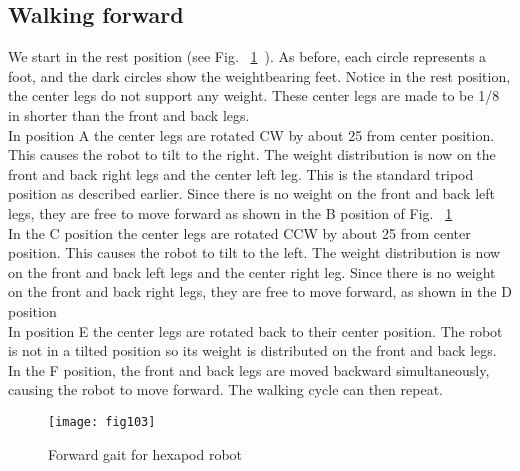 \documentclass{report}
\begin{document}
\subsection{Walking forward}
We start in the rest position (see Fig. ~\ref{35}\ ). As before, each circle represents a foot, and the dark circles
show the weightbearing feet. Notice in the rest position, the center legs do not support any weight. These
center legs are made to be 1/8 in shorter than the front and back legs.\\
In position A the center legs are rotated CW by about 25 from center position. This causes the robot to tilt to the right. The weight distribution is now on the front and back right legs and the center left leg.
This is the standard tripod position as described earlier. Since there is no weight on the front and back left
legs, they are free to move forward as shown in the B position of Fig. ~\ref{35}\ \\
In the C position the center legs are rotated CCW by about 25 from center position. This causes the
robot to tilt to the left. The weight distribution is now on the front and back left legs and the center right
leg. Since there is no weight on the front and back right legs, they are free to move forward, as shown in the
D position\\
In position E the center legs are rotated back to their center position. The robot is not in a tilted position
so its weight is distributed on the front and back legs. In the F position, the front and back legs are moved
backward simultaneously, causing the robot to move forward. The walking cycle can then repeat.
\begin{figure}[h!]
\centering
\texttt{[image: fig103]}
\caption{Forward gait for hexapod robot}
\label{35}
\end{figure}
\FloatBarrier
\end{document}
